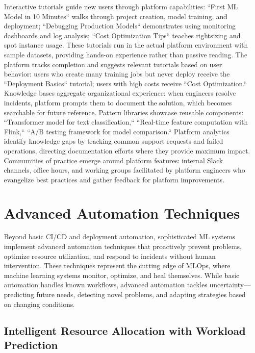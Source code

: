 Interactive tutorials guide new users through platform capabilities: ``First ML Model in 10 Minutes`` walks through project creation, model training, and deployment; ``Debugging Production Models`` demonstrates using monitoring dashboards and log analysis; ``Cost Optimization Tips`` teaches rightsizing and spot instance usage. These tutorials run in the actual platform environment with sample datasets, providing hands-on experience rather than passive reading. The platform tracks completion and suggests relevant tutorials based on user behavior: users who create many training jobs but never deploy receive the ``Deployment Basics`` tutorial; users with high costs receive ``Cost Optimization.`` Knowledge bases aggregate organizational experience: when engineers resolve incidents, platform prompts them to document the solution, which becomes searchable for future reference. Pattern libraries showcase reusable components: ``Transformer model for text classification,`` ``Real-time feature computation with Flink,`` ``A/B testing framework for model comparison.`` Platform analytics identify knowledge gaps by tracking common support requests and failed operations, directing documentation efforts where they provide maximum impact. Communities of practice emerge around platform features: internal Slack channels, office hours, and working groups facilitated by platform engineers who evangelize best practices and gather feedback for platform improvements.

\section{Advanced Automation Techniques}

Beyond basic CI/CD and deployment automation, sophisticated ML systems implement advanced automation techniques that proactively prevent problems, optimize resource utilization, and respond to incidents without human intervention. These techniques represent the cutting edge of MLOps, where machine learning systems monitor, optimize, and heal themselves. While basic automation handles known workflows, advanced automation tackles uncertainty---predicting future needs, detecting novel problems, and adapting strategies based on changing conditions.

\subsection{Intelligent Resource Allocation with Workload Prediction}

